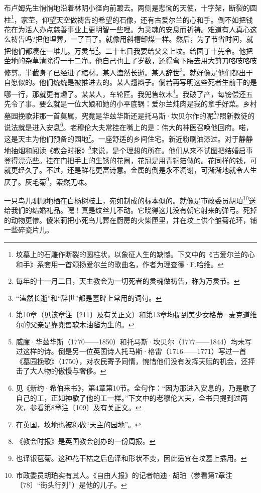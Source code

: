 \par 布卢姆先生悄悄地沿着林阴小径向前踱去。两侧是悲恸的天使，十字架，断裂的圆柱\footnote{坟墓上的石雕作断裂的圆柱状，以象征人生的缺憾。下文中的《古爱尔兰的心和手》系套用一首颂扬爱尔兰的歌曲名，作者为理查德·F.哈维。}，家茔，仰望天空做祷告的希望的石像，还有古爱尔兰的心和手。倒不如把钱花在为活人办点慈善事业上更明智一些哩。为灵魂的安息而祈祷。难道有人真心这么祷告吗?把他埋葬，一了百了。就像用斜槽卸煤一样。然后，为了节省时间，就把他们都凑在一堆儿。万灵节\footnote{每年的十一月二日，天主教会为一切死者的灵魂做祷告，称为万灵节。}。二十七日我要给父亲上坟。给园丁十先令。他把茔地的杂草清除得一干二净。他自己也上了岁数，还得弯下腰去用大剪刀咯吱咯吱修剪。半截身子已经进了棺材。某人溘然长逝。某人辞世\footnote{“溘然长逝”和“辞世”都是墓碑上常用的词句。}。就好像是他们都出于自愿似的。他们统统是被推进去的。某人翘辫子。倘若再写明这些死者生前干的是哪一行，那就更有趣了。某某人，车轮匠。我兜售软木\footnote{第10章（见该章注〔211〕及有关正文）和第13章均提到美少女格蒂·麦克道维尔的父亲是靠兜售软木油毡为生的。}。我破了产，每镑偿还五先令了事。要么就是一位大娘和她的小平底锅：爱尔兰炖肉是我的拿手好菜。乡村墓园挽歌非那一首莫属，究竟是华兹华斯还是托马斯·坎贝尔作的呢\footnote{威廉·华兹华斯（1770——1850）和托马斯·坎贝尔（1777——1844）均未写过这样的诗。倒是另一位英国诗人托马斯·格雷（1716——1771）写过一首《墓园挽歌》（1750），对农民寄予同情，惋惜他们没有发挥天赋的机会，还抨击了大人物的傲慢与奢侈。}?照新教徒的说法就是进入安息\footnote{见《新约·希伯来书》，第4章第10节。全句作：“因为那进入安息的，乃是歇了自己的工，正如神歇了他的工一样。”下文中的老穆伦大夫，全书只提到过两次，参看第8章注〔109〕及有关正文。}。老穆伦大夫常挂在嘴上的是：伟大的神医召唤他回府。喏，这是天主为他们预备的园地\footnote{在英国，坟地也被称做“天主的园地”。}。一座舒适的乡间住宅。新近粉刷油漆过。对于静静地抽烟和阅读《教会时报》\footnote{《教会时报》是英国教会创办的一份周报。}来说，是个理想的所在。他们从来不试图把结婚启事登得漂亮些。挂在门把手上的生锈的花圈，花冠是用青铜箔做的。花同样的钱，可就更经久了。不过，还是鲜花更富诗意。金属的倒是永不凋谢，可渐渐地就令人生厌了。灰毛菊\footnote{也译银苞菊。这种花干枯之后色泽和形状不变，因此适宜在坟墓上插用。}，索然无味。
\par 一只鸟儿驯顺地栖在白杨树枝上，宛如制成的标本似的。就像是市政委员胡珀\footnote{市政委员胡珀实有其人。《自由人报》的记者帕迪·胡珀（参看第7章注〔78〕“街头行列”）是他的儿子。}送给我们的结婚礼品。嘿！真是纹丝儿不动。它晓得这儿没有朝它射来的弹弓。死掉的动物更惨。傻米莉把小死鸟儿葬在厨房的火柴匣里，并在坟上供个雏菊花环，铺一些碎瓷片儿。
